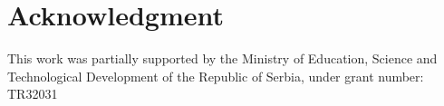 \documentclass[conference]{IEEEtran}
\begin{document}
\section*{Acknowledgment}
This work was partially supported by the Ministry of Education, 
Science and Technological Development of the Republic of Serbia, 
under grant number: TR32031






\end{document}
